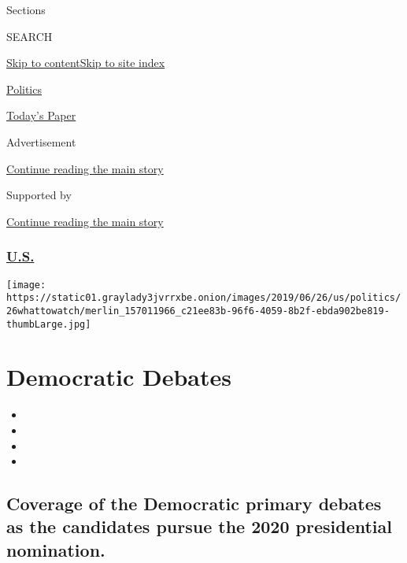 Sections

SEARCH

\protect\hyperlink{site-content}{Skip to
content}\protect\hyperlink{site-index}{Skip to site index}

\href{https://www.nytimes3xbfgragh.onion/section/politics}{Politics}

\href{https://myaccount.nytimes3xbfgragh.onion/auth/login?response_type=cookie\&client_id=vi}{}

\href{https://www.nytimes3xbfgragh.onion/section/todayspaper}{Today's
Paper}

Advertisement

\protect\hyperlink{after-top}{Continue reading the main story}

Supported by

\protect\hyperlink{after-sponsor}{Continue reading the main story}

\hypertarget{us}{%
\subsubsection{\texorpdfstring{\href{/section/us}{U.S.}}{U.S.}}\label{us}}

\texttt{[image: https://static01.graylady3jvrrxbe.onion/images/2019/06/26/us/politics/26whattowatch/merlin\_157011966\_c21ee83b-96f6-4059-8b2f-ebda902be819-thumbLarge.jpg]}

\hypertarget{democratic-debates}{%
\section{Democratic Debates}\label{democratic-debates}}

\begin{itemize}
\item
\item
\item
\item
\end{itemize}

\hypertarget{coverage-of-the-democratic-primary-debates-as-the-candidates-pursue-the-2020-presidential-nomination}{%
\subsection{Coverage of the Democratic primary debates as the candidates
pursue the 2020 presidential
nomination.}\label{coverage-of-the-democratic-primary-debates-as-the-candidates-pursue-the-2020-presidential-nomination}}

